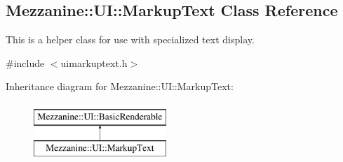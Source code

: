 \hypertarget{classMezzanine_1_1UI_1_1MarkupText}{
\subsection{Mezzanine::UI::MarkupText Class Reference}
\label{classMezzanine_1_1UI_1_1MarkupText}
}


This is a helper class for use with specialized text display.  




{\ttfamily \#include $<$uimarkuptext.h$>$}

Inheritance diagram for Mezzanine::UI::MarkupText:\begin{figure}[H]
\begin{center}
\leavevmode
\includegraphics[height=2.000000cm]{classMezzanine_1_1UI_1_1MarkupText}
\end{center}
\end{figure}
